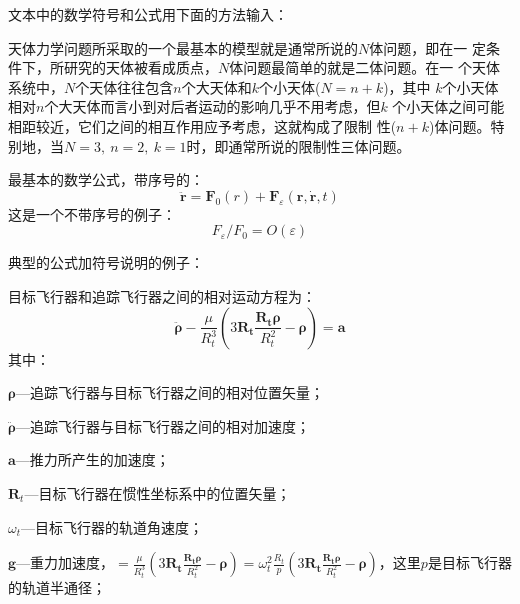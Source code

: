 \label{Tricks:Equations}

文本中的数学符号和公式用下面的方法输入：

天体力学问题所采取的一个最基本的模型就是通常所说的$N$体问题，即在一
定条件下，所研究的天体被看成质点，$N$体问题最简单的就是二体问题。在一
个天体系统中，$N$个天体往往包含$n$个大天体和$k$个小天体($N=n+k$)，其中
$k$个小天体相对$n$个大天体而言小到对后者运动的影响几乎不用考虑，但$k$
个小天体之间可能相距较近，它们之间的相互作用应予考虑，这就构成了限制
性($n+k$)体问题。特别地，当$N=3,~n=2,~k=1$时，即通常所说的限制性三体问题。


最基本的数学公式，带序号的：
\begin{equation}
\ddot{\mathbf{r}}=\mathbf{F}_{0}(r)+\mathbf{F}_{\varepsilon}(\mathbf{r},\dot{\mathbf{r}},t)
\end{equation}
这是一个不带序号的例子：
\begin{displaymath}
F_{\varepsilon}/F_{0}=O (\varepsilon)
\end{displaymath}

\FloatBarrier %
典型的公式加符号说明的例子：

目标飞行器和追踪飞行器之间的相对运动方程为：
\begin{equation}\label{eq:1}
\ddot{\boldsymbol{\rho}}-\frac{\mu}{R_{t}^{3}}\left( 3\mathbf{R_{t}}\frac{\mathbf{R_{t}\rho}}{R_{t}^{2}}-\boldsymbol{\rho}\right)=\mathbf{a}
\end{equation}
其中：

$\boldsymbol{\rho}$---追踪飞行器与目标飞行器之间的相对位置矢量；

$\ddot{\boldsymbol{\rho}}$---追踪飞行器与目标飞行器之间的相对加速度；

$\mathbf{a}$---推力所产生的加速度；

$\mathbf{R}_{t}$---目标飞行器在惯性坐标系中的位置矢量；

$\omega_{t}$---目标飞行器的轨道角速度；

$\mathbf{g}$---重力加速度，$=\frac{\mu}{R_{t}^{3}}\left(
3\mathbf{R_{t}}\frac{\mathbf{R_{t}\rho}}{R_{t}^{2}}-\boldsymbol{\rho}\right)=\omega_{t}^{2}\frac{R_{t}}{p}\left(
3\mathbf{R_{t}}\frac{\mathbf{R_{t}\rho}}{R_{t}^{2}}-\boldsymbol{\rho}\right)$，这里$p$是目标飞行器的轨道半通径；

